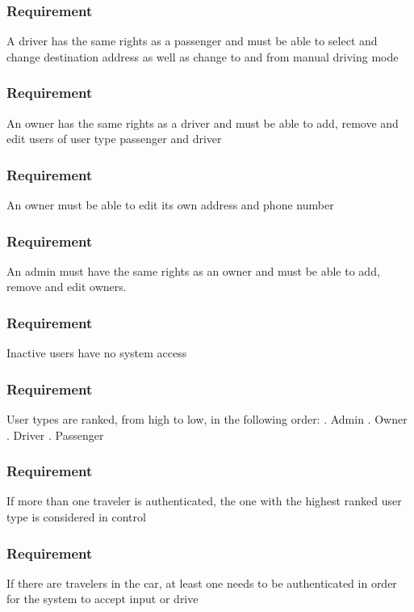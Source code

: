 \documentclass{article}
\begin{document}
{      \subsubsection{Requirement}
\hfill \break 
\- \- \-A driver has the same rights as a passenger and must be able to select and change destination address as well as change to and from manual driving mode
      \subsubsection{Requirement}
\hfill \break 
\- \- \-An owner has the same rights as a driver and must be able to add, remove and edit users of user type passenger and driver
      \subsubsection{Requirement}
\hfill \break 
\- \- \-An owner must be able to edit its own address and phone number
      \subsubsection{Requirement}
\hfill \break 
\- \- \-An admin must have the same rights as an owner and must be able to add, remove and edit owners.
      \subsubsection{Requirement}
\hfill \break 
\- \- \-Inactive users have no system access
      \subsubsection{Requirement}
\hfill \break 
\- \- \-User types are ranked, from high to low, in the following order:
\hfill \break 
{}. Admin
\hfill \break 
{}. Owner
\hfill \break 
{}. Driver
\hfill \break 
{}. Passenger
      \subsubsection{Requirement}
\hfill \break 
\- \- \-If more than one traveler is authenticated, the one with the highest ranked user type is considered in control
      \subsubsection{Requirement}
\hfill \break 
\- \- \-If there are travelers in the car, at least one needs to be authenticated in order for the system to accept input or drive
}
\end{document}
